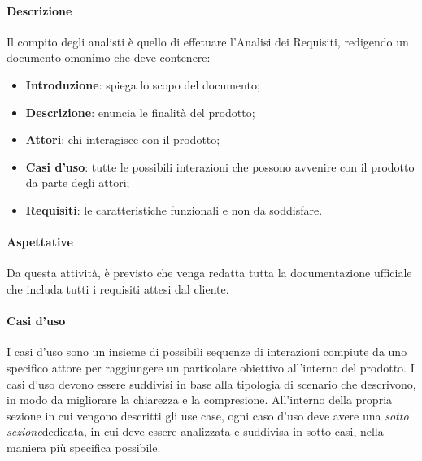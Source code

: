     \paragraph{Descrizione}
    \noindent
    Il compito degli analisti è quello di effetuare l'Analisi dei Requisiti, redigendo un documento omonimo che deve contenere:
        \begin{itemize}
            \item \textbf{Introduzione}: spiega lo scopo del documento;
            \item \textbf{Descrizione}: enuncia le finalità del prodotto;
            \item \textbf{Attori}: chi interagisce con il prodotto;
            \item \textbf{Casi d'uso}\glossario: tutte le possibili interazioni che possono avvenire con il prodotto da parte degli attori;
            \item \textbf{Requisiti}\glossario: le caratteristiche funzionali e non da soddisfare.
        \end{itemize}

    \paragraph{Aspettative}
    \noindent
    Da questa attività, è previsto che venga redatta tutta la documentazione ufficiale che includa tutti i requisiti attesi dal cliente. 
    
    \paragraph{Casi d'uso}
    \noindent
    I casi d'uso sono un insieme di possibili sequenze di interazioni compiute da uno specifico
    attore per raggiungere un particolare obiettivo all'interno del prodotto. I casi d'uso devono essere suddivisi in base alla tipologia di scenario che descrivono,
    in modo da migliorare la chiarezza e la compresione. All'interno della propria sezione in cui vengono descritti gli use case, ogni caso d'uso
    deve avere una \textit{sotto sezione}\glossario  dedicata, in cui deve essere analizzata e suddivisa in sotto casi, nella maniera più specifica possibile.

